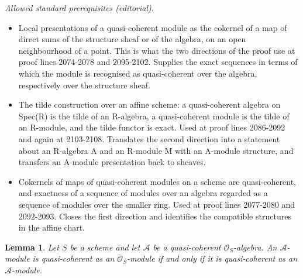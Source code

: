 \documentclass[10pt,a4paper]{amsart}
\theoremstyle{plain}
\newtheorem{lemma}[subsection]{Lemma}
\theoremstyle{definition}
\theoremstyle{remark}
\numberwithin{equation}{subsection}
\newenvironment{reference}{\comment}{\endcomment}
\begin{document}
\noindent\textit{Allowed standard prerequisites (editorial).}\begin{itemize}
\item Local presentations of a quasi-coherent module as the cokernel of a map of direct sums of the structure sheaf or of the algebra, on an open neighbourhood of a point. This is what the two directions of the proof use at proof lines 2074-2078 and 2095-2102. Supplies the exact sequences in terms of which the module is recognised as quasi-coherent over the algebra, respectively over the structure sheaf.
\item The tilde construction over an affine scheme: a quasi-coherent algebra on Spec(R) is the tilde of an R-algebra, a quasi-coherent module is the tilde of an R-module, and the tilde functor is exact. Used at proof lines 2086-2092 and again at 2103-2108. Translates the second direction into a statement about an R-algebra A and an R-module M with an A-module structure, and transfers an A-module presentation back to sheaves.
\item Cokernels of maps of quasi-coherent modules on a scheme are quasi-coherent, and exactness of a sequence of modules over an algebra regarded as a sequence of modules over the smaller ring. Used at proof lines 2077-2080 and 2092-2093. Closes the first direction and identifies the compatible structures in the affine chart.
\end{itemize}\medskip
\begin{lemma}
\label{lemma-quasi-coherence-scalar-restriction}
\begin{reference}
\cite[I, Proposition 9.6.1]{EGA}
\end{reference}
Let $S$ be a scheme and let $\mathcal{A}$ be a quasi-coherent
$\mathcal{O}_S$-algebra. An $\mathcal{A}$-module is
quasi-coherent as an $\mathcal{O}_S$-module if and only if
it is quasi-coherent as an $\mathcal{A}$-module.
\end{lemma}
\end{document}
